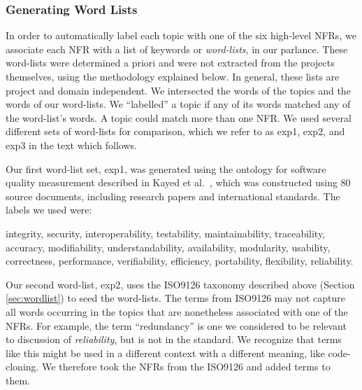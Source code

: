 \documentclass[smallextended]{svjour3}       %
\begin{document}
\subsubsection{Generating Word Lists}


In order to automatically label each topic with 
one of the six high-level NFRs,
we associate each NFR with a list
of keywords or \emph{word-lists}, in our parlance. These word-lists were determined a priori and were not extracted from the projects themselves, using the methodology explained below. In general, these lists are project and domain independent.
We intersected the words of the topics and the words of our word-lists.
We ``labelled'' a topic if any of its words matched any of the word-list's words.
A topic could match more than one NFR.
We used several different sets of word-lists for comparison, which we
refer to as \textsf{exp1}, \textsf{exp2}, and \textsf{exp3} in the text which follows. 

Our first word-list set, \textsf{exp1}, was generated using the ontology for software quality measurement described in Kayed et al.~\cite{5072519}, which was constructed using 80 source documents, including research papers and international standards. 
The labels we used were:

\vspace{2mm}
\parbox{0.7\textwidth}{
\small \textsf{
integrity, security,
interoperability, testability, maintainability, traceability,
accuracy, modifiability, understandability, availability, modularity,
usability, correctness, performance, verifiability, efficiency,
portability, flexibility, reliability.
}}
\vspace{2mm}

Our second word-list, \textsf{exp2}, uses the ISO9126 taxonomy described above (Section \ref{sec:wordlist}) to seed the word-lists.
The terms from ISO9126 may not capture all words occurring in the topics that are nonetheless associated with one of the NFRs. 
For example, the term ``redundancy'' is one 
we considered to be
relevant to discussion of \emph{reliability}, but is not in the
standard. We recognize that terms like this might be used in a
different context with a different meaning, like code-cloning.
We therefore took the NFRs from the ISO9126 and added terms to them.
\end{document}
